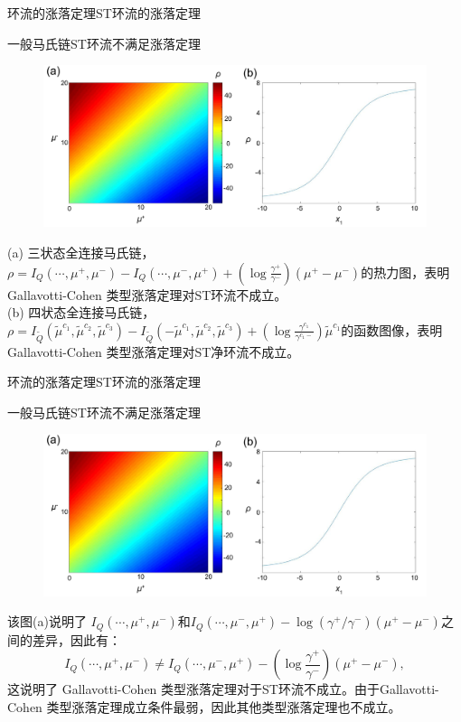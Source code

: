 \documentclass{beamer}
\begin{document}
\begin{frame}{环流的涨落定理}{ST环流的涨落定理}
	\begin{block}{一般马氏链ST环流不满足涨落定理}
		\begin{figure}[h]
			\centering
			\includegraphics[scale=0.14]{chart/ratefunction.pdf}
		\end{figure}
		{\tiny (a) 三状态全连接马氏链，$\rho=I_Q(\cdots,\mu^+,\mu^-)-I_Q(\cdots,\mu^-,\mu^+)+(\log\frac{\gamma^+}{\gamma^-})(\mu^+-\mu^-)$的热力图，表明Gallavotti-Cohen 类型涨落定理对ST环流不成立。 \\
		(b) 四状态全连接马氏链，$\rho=I_{\tilde{Q}}(\tilde{\mu}^{c_1},\tilde{\mu}^{c_2},\tilde{\mu}^{c_3})-  I_{\tilde{Q}}(-\tilde{\mu}^{c_1},\tilde{\mu}^{c_2},\tilde{\mu}^{c_3})+(\log\frac{\gamma^{c_1}}{\gamma^{c_1-}})\tilde{\mu}^{c_1}$的函数图像，表明Gallavotti-Cohen 类型涨落定理对ST净环流不成立。}
	\end{block}
\end{frame}

\begin{frame}{环流的涨落定理}{ST环流的涨落定理}
	\begin{block}{一般马氏链ST环流不满足涨落定理}
		\begin{figure}[h]
			\centering
			\includegraphics[scale=0.14]{chart/ratefunction.pdf}
		\end{figure}
		{\tiny 该图(a)说明了 $I_Q(\cdots,\mu^+,\mu^-)$和$I_Q(\cdots,\mu^-,\mu^+)-\log(\gamma^+ /\gamma^-) (\mu^+-\mu^-)$之间的差异，因此有：
		\begin{equation*}
			I_Q(\cdots,\mu^+,\mu^-)
			\neq I_Q(\cdots,\mu^-,\mu^+)-\left(\log\frac{\gamma^+}{\gamma^-}\right)(\mu^+-\mu^-),
		\end{equation*}
		这说明了 Gallavotti-Cohen 类型涨落定理对于ST环流不成立。由于Gallavotti-Cohen 类型涨落定理成立条件最弱，因此其他类型涨落定理也不成立。}
	\end{block}
\end{frame}
\end{document}
